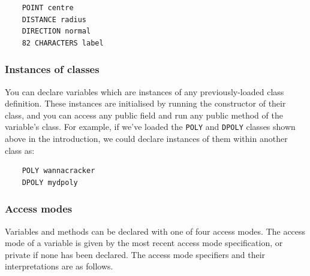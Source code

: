 \documentclass{article}
\begin{document}
\begin{verbatim}
    POINT centre
    DISTANCE radius
    DIRECTION normal
    82 CHARACTERS label
\end{verbatim}

\subsubsection{Instances of classes}

You can declare variables which are instances of any previously-loaded
class definition.  These instances are initialised by running the
constructor of their class, and you can access any public field and
run any public method of the variable's class.  For example, if we've
loaded the {\tt POLY} and {\tt DPOLY} classes shown above in the
introduction, we could declare instances of them within another class
as:

\begin{verbatim}
    POLY wannacracker
    DPOLY mydpoly
\end{verbatim}

\subsubsection{Access modes}

Variables and methods can be declared with one of four access modes.
The access mode of a variable is given by the most recent access mode
specification, or private if none has been declared.  The access mode
specifiers and their interpretations are as follows.
\end{document}
